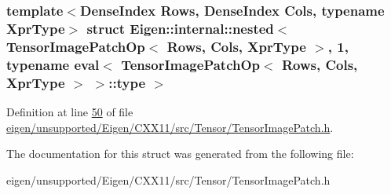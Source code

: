 \subsubsection*{template$<$Dense\+Index Rows, Dense\+Index Cols, typename Xpr\+Type$>$\newline
struct Eigen\+::internal\+::nested$<$ Tensor\+Image\+Patch\+Op$<$ Rows, Cols, Xpr\+Type $>$, 1, typename eval$<$ Tensor\+Image\+Patch\+Op$<$ Rows, Cols, Xpr\+Type $>$ $>$\+::type $>$}



Definition at line \hyperlink{eigen_2unsupported_2_eigen_2_c_x_x11_2src_2_tensor_2_tensor_image_patch_8h_source_l00050}{50} of file \hyperlink{eigen_2unsupported_2_eigen_2_c_x_x11_2src_2_tensor_2_tensor_image_patch_8h_source}{eigen/unsupported/\+Eigen/\+C\+X\+X11/src/\+Tensor/\+Tensor\+Image\+Patch.\+h}.



The documentation for this struct was generated from the following file\+:\begin{DoxyCompactItemize}
\item 
eigen/unsupported/\+Eigen/\+C\+X\+X11/src/\+Tensor/\+Tensor\+Image\+Patch.\+h\end{DoxyCompactItemize}
